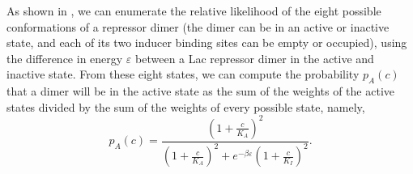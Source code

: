 As shown in \fref[figrepressorInducerStates], we can enumerate the relative
likelihood of the eight possible conformations of a repressor dimer (the dimer
can be in an active or inactive state, and each of its two inducer binding sites
can be empty or occupied), using the difference in energy $\varepsilon$ between a
Lac repressor dimer in the active and inactive state. From these eight states, we can
compute the probability \(p_A(c)\) that a dimer will be in the active state
as the sum of the weights of the active states divided by the sum of the weights
of every possible state, namely,
\begin{equation}\label{eq6}
p_A(c)=\frac{\left(1+\frac{c}{K_A}\right)^2}{\left(1+\frac{c}{K_A}\right)^2+e^{-\beta  \varepsilon }\left(1+\frac{c}{K_I}\right)^2}.
\end{equation}


